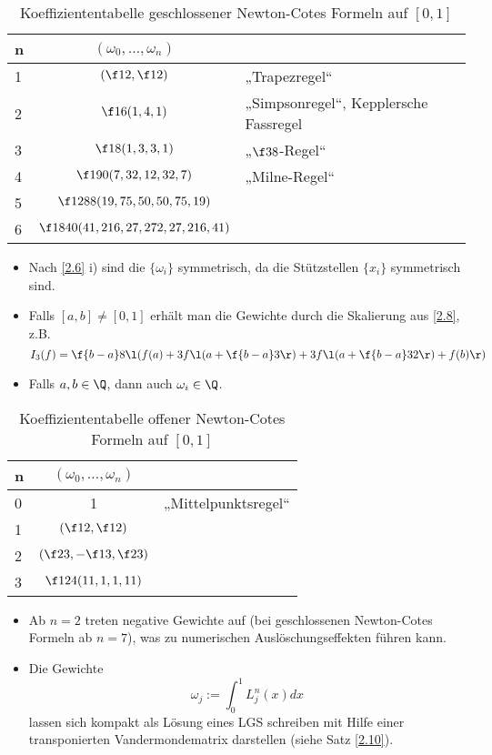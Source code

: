 \documentclass[11pt]{scrbook}
\begin{document}
\begin{table}[!ht]
	\centering
	\caption{Koeffiziententabelle geschlossener Newton-Cotes Formeln auf $[0,1]$}
	\begin{tabular}{l|cl}
		n & $(\omega_0, \dotsc, \omega_n)$ \\ \hline
		1 & $(\f 12, \f 12)$ & „Trapezregel“ \\ 
		2 & $\f 16 (1,4,1)$ & „Simpsonregel“, Kepplersche Fassregel \\
		3 & $\f 18 (1,3,3,1)$ & „$\f 38$-Regel“ \\
		4 & $\f 1{90} (7,32,12,32,7)$ & „Milne-Regel“ \\
		5 & $\f 1{288} (19,75,50,50,75,19)$ & \\
		6 & $\f 1{840} (41,216,27,272,27,216,41)$ &
	\end{tabular}
\end{table}

\begin{nt*}
	\begin{itemize}
		\item
			Nach \ref{2.6} i) sind die $\{\omega_i\}$ symmetrisch, da die Stützstellen $\{x_i\}$ symmetrisch sind.
		\item
			Falls $[a,b] \neq [0,1]$ erhält man die Gewichte durch die Skalierung aus \ref{2.8}, z.B.
			\[
				I_3(f) = \f {b-a}8 \l( f(a) + 3 f\l(a+\f {b-a}3\r) + 3 f\l(a+\f {b-a}3 2\r) + f(b) \r)
			\]
		\item
			Falls $a,b\in \Q$, dann auch $\omega_i \in \Q$.
	\end{itemize}
\end{nt*}

\begin{table}[!ht]
	\centering
	\caption{Koeffiziententabelle offener Newton-Cotes Formeln auf $[0,1]$}
	\begin{tabular}{l|cl}
		n & $(\omega_0, \dotsc, \omega_n)$ \\ \hline
		0 & 1 & „Mittelpunktsregel“ \\ 
		1 & $(\f 12, \f 12)$ & \\
		2 & $(\f 23, -\f 13, \f 23)$ &  \\
		3 & $\f 1{24} (11,1,1,11)$ &
	\end{tabular}
\end{table}

\begin{nt*}
	\begin{itemize}
		\item
			Ab $n=2$ treten negative Gewichte auf (bei geschlossenen Newton-Cotes Formeln ab $n=7$), was zu numerischen Auslöschungseffekten führen kann.
		\item
			Die Gewichte
			\[
				\omega_j := \int_0^1 L_j^n(x) dx
			\]
			lassen sich kompakt als Lösung eines LGS schreiben mit Hilfe einer transponierten Vandermondematrix darstellen (siehe Satz \ref{2.10}).
	\end{itemize}
\end{nt*}
\end{document}
